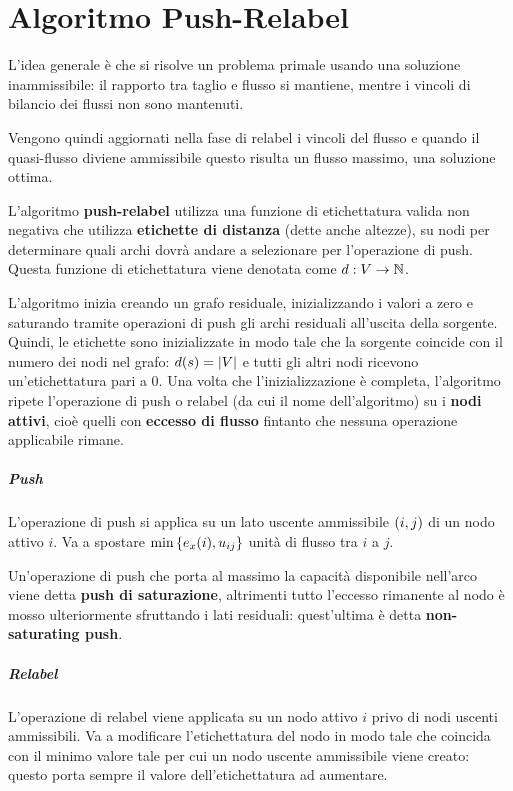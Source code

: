 \documentclass[\main/main.tex]{subfiles}
\begin{document}
\chapter{Algoritmo Push-Relabel}
L'idea generale è che si risolve un problema primale usando una soluzione inammissibile: il rapporto tra taglio e flusso si mantiene, mentre i vincoli di bilancio dei flussi non sono mantenuti.

Vengono quindi aggiornati nella fase di relabel i vincoli del flusso e quando il quasi-flusso diviene ammissibile questo risulta un flusso massimo, una soluzione ottima.

L'algoritmo \textbf{push-relabel} utilizza una funzione di etichettatura valida non negativa che utilizza \textbf{etichette di distanza} (dette anche altezze), su nodi per determinare quali archi dovrà andare a selezionare per l'operazione di push. Questa funzione di etichettatura viene denotata come \(d: V \rightarrow \mathbb{N} \).

L'algoritmo inizia creando un grafo residuale, inizializzando i valori a zero e saturando tramite operazioni di push gli archi residuali all'uscita della sorgente. Quindi, le etichette sono inizializzate in modo tale che la sorgente coincide con il numero dei nodi nel grafo: \(d(s) = \left\lvert V\right\rvert\) e tutti gli altri nodi ricevono un'etichettatura pari a \(0\). Una volta che l'inizializzazione è completa, l'algoritmo ripete l'operazione di push o relabel (da cui il nome dell'algoritmo) su i \textbf{nodi attivi}, cioè quelli con \textbf{eccesso di flusso} fintanto che nessuna operazione applicabile rimane.

\paragraph*{Push} L'operazione di push si applica su un lato uscente ammissibile \(\left(i,j\right)\) di un nodo attivo \(i\). Va a spostare \(\min\left\{e_x(i), u_{ij}\right\}\) unità di flusso tra \(i\) a \(j\).

Un'operazione di push che porta al massimo la capacità disponibile nell'arco viene detta \textbf{push di saturazione}, altrimenti tutto l'eccesso rimanente al nodo è mosso ulteriormente sfruttando i lati residuali: quest'ultima è detta \textbf{non-saturating push}.

\paragraph*{Relabel} L'operazione di relabel viene applicata su un nodo attivo \(i\) privo di nodi uscenti ammissibili. Va a modificare l'etichettatura del nodo in modo tale che coincida con il minimo valore tale per cui un nodo uscente ammissibile viene creato: questo porta sempre il valore dell'etichettatura ad aumentare.
\end{document}
